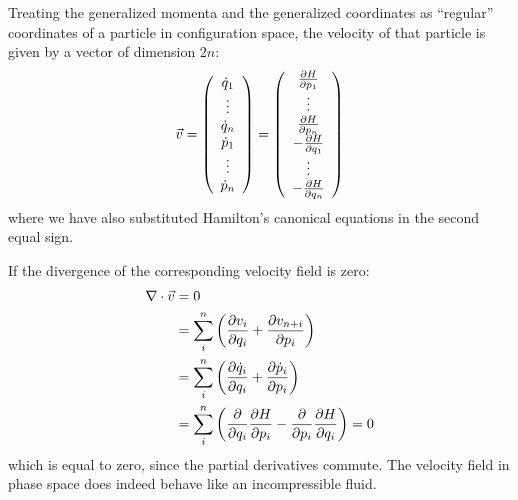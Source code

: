 Treating the generalized momenta and the generalized coordinates as ``regular'' coordinates of a particle in configuration space, the velocity of that particle is given by a vector of dimension $2n$:
\begin{align}
\vec v=\left(\begin{array}{c}
\dot q_1 \\ \vdots \\ \dot q_n \\ \dot p_1 \\ \vdots \\ \dot p_n \\
\end{array} \right) = \left(\begin{array}{c}
 \frac{\partial H}{\partial p_1} \\ \vdots \\ \frac{\partial H}{\partial p_n} \\ -\frac{\partial H}{\partial q_1} \\ \vdots \\ -\frac{\partial H}{\partial q_n} \\
\end{array} \right)
\end{align}
where we have also substituted Hamilton's canonical equations in the second equal sign.

If the divergence of the corresponding velocity field is zero:
\begin{align}
\nabla \cdot \vec v &=0\nonumber\\
&=\sum_i^n\left(\frac{\partial v_i}{\partial q_i}+\frac{\partial v_{n+i}}{\partial p_i}\right)\nonumber\\
&=\sum_i^n\left(\frac{\partial \dot q_i}{\partial q_i}+\frac{\partial \dot p_i}{\partial p_i}\right)\nonumber\\
&=\sum_i^n\left(\frac{\partial }{\partial q_i}\frac{\partial H}{\partial p_i}-\frac{\partial }{\partial p_i}\frac{\partial H}{\partial q_i}\right)=0
\end{align}
which is equal to zero, since the partial derivatives commute. The velocity field in phase space does indeed behave like an incompressible fluid.

